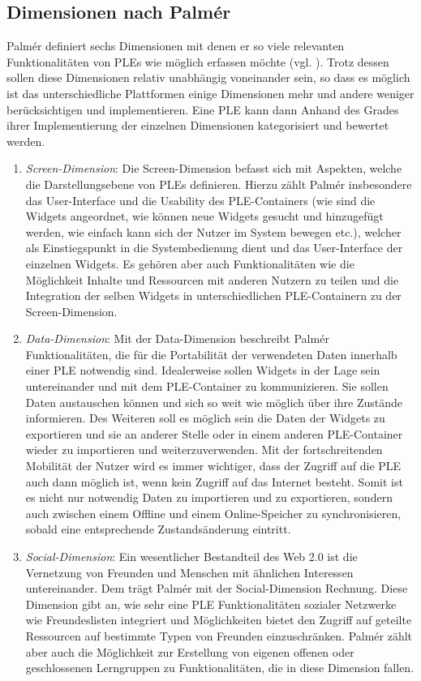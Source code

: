 \subsection{Dimensionen nach Palmér}\label{section:dimensions_palmer} 
Palmér definiert sechs Dimensionen mit denen er so viele relevanten Funktionalitäten von PLEs wie möglich erfassen möchte (vgl. \cite{Palmer2009}). Trotz dessen sollen diese Dimensionen relativ unabhängig voneinander sein, so dass es möglich ist das unterschiedliche Plattformen einige Dimensionen mehr und andere weniger berücksichtigen und implementieren. Eine PLE kann dann Anhand des Grades ihrer Implementierung der einzelnen Dimensionen kategorisiert und bewertet werden.
\begin{enumerate}
 \item \emph{Screen-Dimension}: Die Screen-Dimension befasst sich mit Aspekten, welche die Darstellungsebene von PLEs definieren. Hierzu zählt Palmér insbesondere das User-Interface und die Usability des PLE-Containers (wie sind die Widgets angeordnet, wie können neue Widgets gesucht und hinzugefügt werden, wie einfach kann sich der Nutzer im System bewegen etc.), welcher als Einstiegspunkt in die Systembedienung dient und das User-Interface der einzelnen Widgets. Es gehören aber auch Funktionalitäten wie die Möglichkeit Inhalte und Ressourcen mit anderen Nutzern zu teilen und die Integration der selben Widgets in unterschiedlichen PLE-Containern zu der Screen-Dimension.
 \item \emph{Data-Dimension}: Mit der Data-Dimension beschreibt Palmér Funktionalitäten, die für die Portabilität der verwendeten Daten innerhalb einer PLE notwendig sind. Idealerweise sollen Widgets in der Lage sein untereinander und mit dem PLE-Container zu kommunizieren. Sie sollen Daten austauschen können und sich so weit wie möglich über ihre Zustände informieren. Des Weiteren soll es möglich sein die Daten der Widgets zu exportieren und sie an anderer Stelle oder in einem anderen PLE-Container wieder zu importieren und weiterzuverwenden. Mit der fortschreitenden Mobilität der Nutzer wird es immer wichtiger, dass der Zugriff auf die PLE auch dann möglich ist, wenn kein Zugriff auf das Internet besteht. Somit ist es nicht nur notwendig Daten zu importieren und zu exportieren, sondern auch zwischen einem Offline und einem Online-Speicher zu synchronisieren, sobald eine entsprechende Zustandsänderung eintritt.
 \item \emph{Social-Dimension}: Ein wesentlicher Bestandteil des Web 2.0 ist die Vernetzung von Freunden und Menschen mit ähnlichen Interessen untereinander. Dem trägt Palmér mit der Social-Dimension Rechnung. Diese Dimension gibt an, wie sehr eine PLE Funktionalitäten sozialer Netzwerke wie Freundeslisten integriert und Möglichkeiten bietet den Zugriff auf geteilte Ressourcen auf bestimmte Typen von Freunden einzuschränken. Palmér zählt aber auch die Möglichkeit zur Erstellung von eigenen offenen oder geschlossenen Lerngruppen zu Funktionalitäten, die in diese Dimension fallen.

\end{enumerate}
